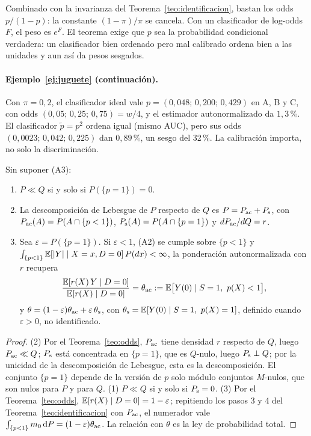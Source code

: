 Combinado con la invarianza del Teorema~\ref{teo:identificacion}, bastan los odds $p/(1-p)$: la constante $(1-\pi)/\pi$ se cancela. Con un clasificador de log-odds $F$, el peso es $e^{F}$. El teorema exige que $p$ sea la probabilidad condicional verdadera: un clasificador bien ordenado pero mal calibrado ordena bien a las unidades y aun así da pesos sesgados.

\paragraph{Ejemplo~\ref{ej:juguete} (continuación).}
Con $\pi=0,2$, el clasificador ideal vale $p=(0,048;\,0,200;\,0,429)$ en A, B y C, con odds $(0,05;\,0,25;\,0,75)=w/4$, y el estimador autonormalizado da $1,3\,\%$. El clasificador $\tilde p=p^2$ ordena igual (mismo AUC), pero sus odds $(0,0023;\,0,042;\,0,225)$ dan $0,89\,\%$, un sesgo del 32\,\%. La calibración importa, no solo la discriminación.


\begin{teorema}\label{teo:lebesgue}
Sin suponer (A3):
\begin{enumerate}
  \item $P\ll Q$ si y solo si $P(\{p=1\})=0$.
  \item La descomposición de Lebesgue de $P$ respecto de $Q$ es $P=P_{\mathrm{ac}}+P_{\mathrm{s}}$, con $P_{\mathrm{ac}}(A)=P(A\cap\{p<1\})$, $P_{\mathrm{s}}(A)=P(A\cap\{p=1\})$ y $dP_{\mathrm{ac}}/dQ=r$.
  \item Sea $\varepsilon=P(\{p=1\})$. Si $\varepsilon<1$, (A2) se cumple sobre $\{p<1\}$ y $\int_{\{p<1\}}\mathbb{E}[|Y|\mid X=x,D=0]\,P(dx)<\infty$, la ponderación autonormalizada con $r$ recupera
  \[
  \frac{\E[r(X)\,Y\mid D=0]}{\E[r(X)\mid D=0]}=\thac:=\E\bigl[Y(0)\mid S=1,\ p(X)<1\bigr],
  \]
  y $\theta=(1-\varepsilon)\theta_{\mathrm{ac}}+\varepsilon\,\theta_{\mathrm{s}}$, con $\theta_{\mathrm{s}}=\mathbb{E}[Y(0)\mid S=1,\ p(X)=1]$, definido cuando $\varepsilon>0$, no identificado.
\end{enumerate}
\end{teorema}
\begin{proof}
(2) Por el Teorema~\ref{teo:odds}, $P_{\mathrm{ac}}$ tiene densidad $r$ respecto de $Q$, luego $P_{\mathrm{ac}}\ll Q$; $P_{\mathrm{s}}$ está concentrada en $\{p=1\}$, que es $Q$-nulo, luego $P_{\mathrm{s}}\perp Q$; por la unicidad de la descomposición de Lebesgue, esta es la descomposición. El conjunto $\{p=1\}$ depende de la versión de $p$ solo módulo conjuntos $M$-nulos, que son nulos para $P$ y para $Q$. (1) $P\ll Q$ si y solo si $P_{\mathrm{s}}=0$. (3) Por el Teorema~\ref{teo:odds}, $\mathbb{E}[r(X)\mid D=0]=1-\varepsilon$; repitiendo los pasos 3 y 4 del Teorema~\ref{teo:identificacion} con $P_{\mathrm{ac}}$, el numerador vale $\int_{\{p<1\}}m_0\,\mathrm{d} P=(1-\varepsilon)\theta_{\mathrm{ac}}$. La relación con $\theta$ es la ley de probabilidad total.
\end{proof}

